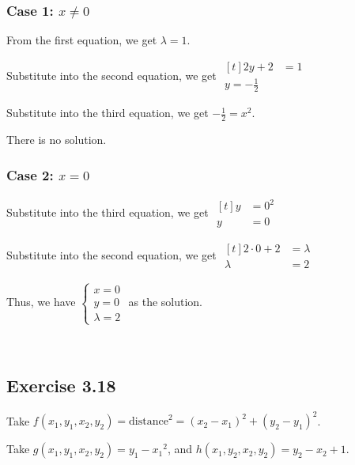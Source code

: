 \documentclass[11pt,fleqn]{book} %
\begin{document}
\subsubsection*{Case 1: $x \neq 0$}

From the first equation, we get $\lambda = 1$. 

Substitute into the second equation, we get $\begin{aligned}[t]
    2y + 2 & = 1 \\ y = -\frac{1}{2}
\end{aligned}$

Substitute into the third equation, we get $-\frac{1}{2} = x^2$. 

There is no solution. 

\subsubsection*{Case 2: $x = 0$}

Substitute into the third equation, we get $\begin{aligned}[t]
    y & = 0^2 \\
    y & = 0
\end{aligned}$

Substitute into the second equation, we get $\begin{aligned}[t]
    2 \cdot 0 + 2 & = \lambda \\
    \lambda       & = 2
\end{aligned}$

Thus, we have $\begin{cases} x = 0 \\ y = 0 \\ \lambda = 2 \end{cases}$ as the solution. 

{~~~}

\subsection*{Exercise 3.18}

Take $f(x_1, y_1, x_2, y_2) = \text{distance}^2 = (x_2 - x_1)^2 + (y_2 - y_1)^2$. 

Take $g(x_1, y_1, x_2, y_2) = y_1 - {x_1}^2$, and $h(x_1, y_2, x_2, y_2) = y_2 - x_2 + 1$. 
\end{document}
